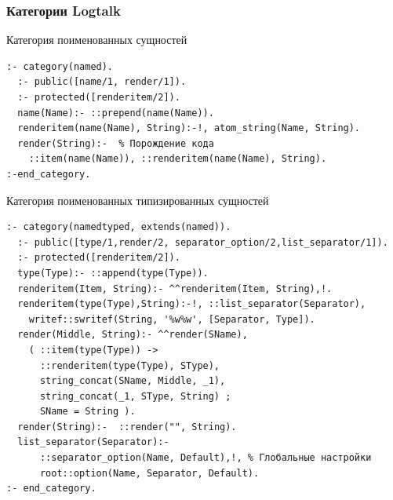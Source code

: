 \documentclass[10pt]{beamer}
\begin{document}
\begin{frame}[fragile]
  \frametitle{Категории Logtalk}
  Категория поименованных сущностей
\begin{verbatim}
:- category(named).
  :- public([name/1, render/1]).
  :- protected([renderitem/2]).
  name(Name):- ::prepend(name(Name)).
  renderitem(name(Name), String):-!, atom_string(Name, String).
  render(String):-  % Порождение кода
    ::item(name(Name)), ::renderitem(name(Name), String).
:-end_category.
\end{verbatim}
Категория поименованных типизированных сущностей
\begin{verbatim}
:- category(namedtyped, extends(named)).
  :- public([type/1,render/2, separator_option/2,list_separator/1]).
  :- protected([renderitem/2]).
  type(Type):- ::append(type(Type)).
  renderitem(Item, String):- ^^renderitem(Item, String),!.
  renderitem(type(Type),String):-!, ::list_separator(Separator),
    writef::swritef(String, '%w%w', [Separator, Type]).
  render(Middle, String):- ^^render(SName),
    ( ::item(type(Type)) ->
      ::renderitem(type(Type), SType),
      string_concat(SName, Middle, _1),
      string_concat(_1, SType, String) ;
      SName = String ).
  render(String):-  ::render("", String).
  list_separator(Separator):-
      ::separator_option(Name, Default),!, % Глобальные настройки
      root::option(Name, Separator, Default).
:- end_category.
\end{verbatim}
\end{frame}
\end{document}
